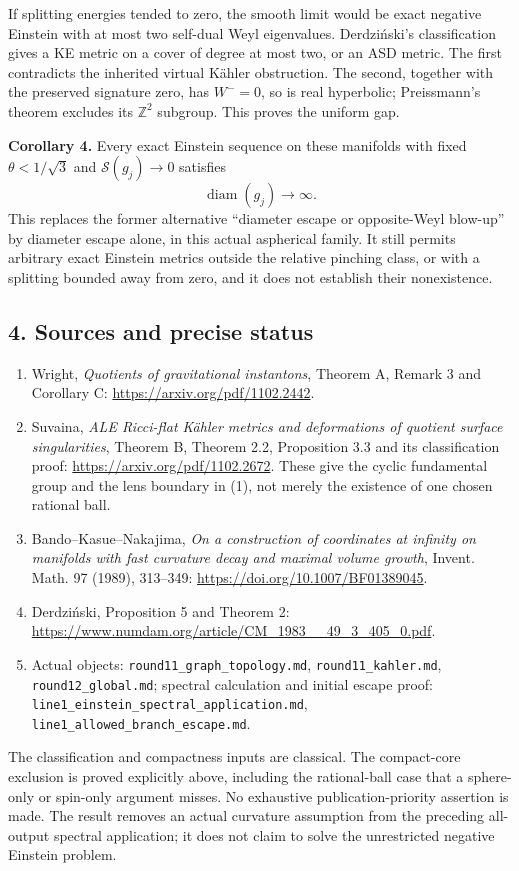 \documentclass[
  11pt,
]{article}
\providecommand{\tightlist}{%
  \setlength{\itemsep}{0pt}\setlength{\parskip}{0pt}}
\begin{document}
If splitting energies tended to zero, the smooth limit would be exact
negative Einstein with at most two self-dual Weyl eigenvalues.
Derdziński's classification gives a KE metric on a cover of degree at
most two, or an ASD metric. The first contradicts the inherited virtual
Kähler obstruction. The second, together with the preserved signature
zero, has \(W^-=0\), so is real hyperbolic; Preissmann's theorem
excludes its \(\mathbb Z^2\) subgroup. This proves the uniform gap.

\textbf{Corollary 4.} Every exact Einstein sequence on these manifolds
with fixed \(\theta<1/\sqrt3\) and \(\mathscr S(g_j)\to0\) satisfies \[
                          \operatorname{diam}(g_j)\to\infty.
\] This replaces the former alternative ``diameter escape or
opposite-Weyl blow-up'' by diameter escape alone, in this actual
aspherical family. It still permits arbitrary exact Einstein metrics
outside the relative pinching class, or with a splitting bounded away
from zero, and it does not establish their nonexistence.

\hypertarget{sources-and-precise-status}{%
\subsection{4. Sources and precise
status}\label{sources-and-precise-status}}

\begin{enumerate}
\def\labelenumi{\arabic{enumi}.}
\tightlist
\item
  Wright, \emph{Quotients of gravitational instantons}, Theorem A,
  Remark 3 and Corollary C: \url{https://arxiv.org/pdf/1102.2442}.
\item
  Suvaina, \emph{ALE Ricci-flat Kähler metrics and deformations of
  quotient surface singularities}, Theorem B, Theorem 2.2, Proposition
  3.3 and its classification proof:
  \url{https://arxiv.org/pdf/1102.2672}. These give the cyclic
  fundamental group and the lens boundary in (1), not merely the
  existence of one chosen rational ball.
\item
  Bando--Kasue--Nakajima, \emph{On a construction of coordinates at
  infinity on manifolds with fast curvature decay and maximal volume
  growth}, Invent. Math. 97 (1989), 313--349:
  \url{https://doi.org/10.1007/BF01389045}.
\item
  Derdziński, Proposition 5 and Theorem 2:
  \url{https://www.numdam.org/article/CM_1983__49_3_405_0.pdf}.
\item
  Actual objects: \texttt{round11\_graph\_topology.md},
  \texttt{round11\_kahler.md}, \texttt{round12\_global.md}; spectral
  calculation and initial escape proof:
  \texttt{line1\_einstein\_spectral\_application.md},
  \texttt{line1\_allowed\_branch\_escape.md}.
\end{enumerate}

The classification and compactness inputs are classical. The
compact-core exclusion is proved explicitly above, including the
rational-ball case that a sphere-only or spin-only argument misses. No
exhaustive publication-priority assertion is made. The result removes an
actual curvature assumption from the preceding all-output spectral
application; it does not claim to solve the unrestricted negative
Einstein problem.
\end{document}
